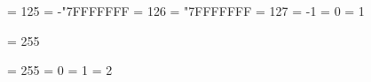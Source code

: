 \countdef   \mincountervalue        =   125 \mincountervalue        = -"7FFFFFFF %
\countdef   \maxcountervalue        =   126 \maxcountervalue        =  "7FFFFFFF %
\countdef   \minusone               =   127 \minusone               = -1
\chardef    \zerocount              =     0
\chardef    \plusone                =     1

\chardef    \normalpagebox          =   255 %


\countdef   \count@                 =   255 %
\dimendef   \dimen@                 =     0
\dimendef   \dimen@i                =     1 %
\dimendef   \dimen@ii               =     2


\def\wlog#1{} %


\def\newcount   {\allocateregister\lastallocatedcount    \count   \countdef   \maxallocatedregister}
\def\newdimen   {\allocateregister\lastallocateddimen    \dimen   \dimendef   \maxallocatedregister}
\def\newskip    {\allocateregister\lastallocatedskip     \skip    \skipdef    \maxallocatedregister}
\def\newmuskip  {\allocateregister\lastallocatedmuskip   \muskip  \muskipdef  \maxallocatedregister}
\def\newbox     {\allocateregister\lastallocatedbox      \box     \mathchardef\maxallocatedregister}
\def\newtoks    {\allocateregister\lastallocatedtoks     \toks    \toksdef    \maxallocatedregister}
\def\newread    {\allocateregister\lastallocatedread     \read    \chardef    \maxallocatediochannel}
\def\newwrite   {\allocateregister\lastallocatedwrite    \write   \chardef    \maxallocatediochannel}
\def\newmarks   {\allocateregister\lastallocatedmarks    \marks   \mathchardef\maxallocatedregister}
\def\newlanguage{\allocateregister\lastallocatedlanguage \language\chardef    \maxallocatedlanguage}
\def\newinsert  {\allocateregister\lastallocatedinsertion\insert  \chardef    \maxallocatedinsert}
\def\newfamily  {\allocateregister\lastallocatedfamily   \fam     \chardef    \maxallocatedfamily}

